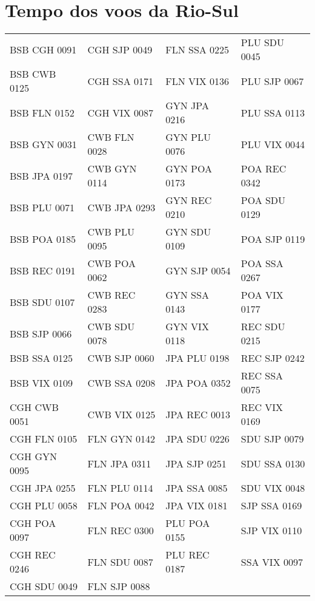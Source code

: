 \chapter{Tempo dos voos da Rio-Sul}\label{anx:timeriosul}


\begin{scriptsize}

\begin{longtable}{l l l l}


BSB CGH 0091 & CGH SJP 0049 & FLN SSA 0225 & PLU SDU 0045 \\
BSB CWB 0125 & CGH SSA 0171 & FLN VIX 0136 & PLU SJP 0067 \\
BSB FLN 0152 & CGH VIX 0087 & GYN JPA 0216 & PLU SSA 0113 \\
BSB GYN 0031 & CWB FLN 0028 & GYN PLU 0076 & PLU VIX 0044 \\
BSB JPA 0197 & CWB GYN 0114 & GYN POA 0173 & POA REC 0342 \\
BSB PLU 0071 & CWB JPA 0293 & GYN REC 0210 & POA SDU 0129 \\
BSB POA 0185 & CWB PLU 0095 & GYN SDU 0109 & POA SJP 0119 \\
BSB REC 0191 & CWB POA 0062 & GYN SJP 0054 & POA SSA 0267 \\
BSB SDU 0107 & CWB REC 0283 & GYN SSA 0143 & POA VIX 0177 \\
BSB SJP 0066 & CWB SDU 0078 & GYN VIX 0118 & REC SDU 0215 \\
BSB SSA 0125 & CWB SJP 0060 & JPA PLU 0198 & REC SJP 0242 \\
BSB VIX 0109 & CWB SSA 0208 & JPA POA 0352 & REC SSA 0075 \\
CGH CWB 0051 & CWB VIX 0125 & JPA REC 0013 & REC VIX 0169 \\
CGH FLN 0105 & FLN GYN 0142 & JPA SDU 0226 & SDU SJP 0079 \\
CGH GYN 0095 & FLN JPA 0311 & JPA SJP 0251 & SDU SSA 0130 \\
CGH JPA 0255 & FLN PLU 0114 & JPA SSA 0085 & SDU VIX 0048 \\
CGH PLU 0058 & FLN POA 0042 & JPA VIX 0181 & SJP SSA 0169 \\
CGH POA 0097 & FLN REC 0300 & PLU POA 0155 & SJP VIX 0110 \\
CGH REC 0246 & FLN SDU 0087 & PLU REC 0187 & SSA VIX 0097 \\
CGH SDU 0049 & FLN SJP 0088 & & \\


\end{longtable}

\end{scriptsize}